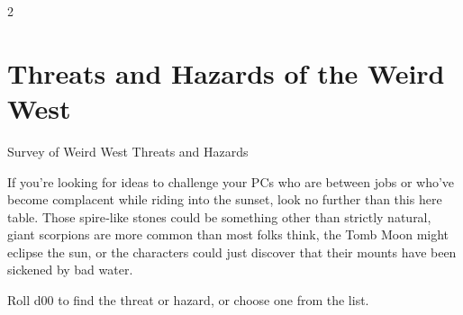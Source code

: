 \clearpage

\begin{multicols}{2}

\chapter{Threats and Hazards of the Weird West}

Survey of Weird West Threats and Hazards

If you’re looking for ideas to challenge your PCs who are between jobs or who’ve become complacent while riding into the sunset, look no further than this here table. Those spire‑like stones could be something other than strictly natural, giant scorpions are more common than most folks think, the Tomb Moon might eclipse the sun, or the characters could just discover that their mounts have been sickened by bad water. 

Roll d00 to find the threat or hazard, or choose one from the list. 

\end{multicols}

